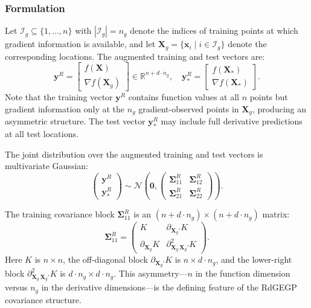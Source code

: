 \documentclass[12pt]{article}
\begin{document}
\subsubsection{Formulation}
\label{subsubsec:rdgegp_formulation}

Let $\mathcal{I}_g \subseteq \{1, \ldots, n\}$ with $|\mathcal{I}_g| = n_g$ denote the indices of training points at which gradient information is available, and let $\mathbf{X}_g = \{\mathbf{x}_i \mid i \in \mathcal{I}_g\}$ denote the corresponding locations. The augmented training and test vectors are:
\begin{equation}
	\label{eqn:rdgegp_aug_vectors}
	\mathbf{y}^{R} = \begin{bmatrix} f(\mathbf{X}) \\ \nabla f(\mathbf{X}_g) \end{bmatrix} \in \mathbb{R}^{n + d \cdot n_g}, \quad
	\mathbf{y}^{R}_* = \begin{bmatrix} f(\mathbf{X}_*) \\ \nabla f(\mathbf{X}_*) \end{bmatrix}.
\end{equation}
Note that the training vector $\mathbf{y}^R$ contains function values at all $n$ points but gradient information only at the $n_g$ gradient-observed points in $\mathbf{X}_g$, producing an asymmetric structure. The test vector $\mathbf{y}^R_*$ may include full derivative predictions at all test locations.

The joint distribution over the augmented training and test vectors is multivariate Gaussian:
\begin{equation}
	\label{eqn:rdgegp_joint_dist}
	\begin{pmatrix}
		\mathbf{y}^{R} \\
		\mathbf{y}^{R}_*
	\end{pmatrix}
	\sim \mathcal{N}\left(
	\mathbf{0},
	\begin{pmatrix}
		\boldsymbol{\Sigma}^{R}_{11} & \boldsymbol{\Sigma}^{R}_{12} \\
		\boldsymbol{\Sigma}^{R}_{21} & \boldsymbol{\Sigma}^{R}_{22}
	\end{pmatrix}
	\right).
\end{equation}

The training covariance block $\boldsymbol{\Sigma}^{R}_{11}$ is an $(n + d \cdot n_g) \times (n + d \cdot n_g)$ matrix:
\begin{equation}
	\label{eqn:rdgegp_S11}
	\boldsymbol{\Sigma}^{R}_{11} =
	\begin{pmatrix}
		K & \partial_{\mathbf{X}_g'} K \\
		\partial_{\mathbf{X}_g} K & \partial^2_{\mathbf{X}_g\,\mathbf{X}_g'} K
	\end{pmatrix}.
\end{equation}
Here $K$ is $n \times n$, the off-diagonal block $\partial_{\mathbf{X}_g'} K$ is $n \times d \cdot n_g$, and the lower-right block $\partial^2_{\mathbf{X}_g\,\mathbf{X}_g'} K$ is $d \cdot n_g \times d \cdot n_g$. This asymmetry---$n$ in the function dimension versus $n_g$ in the derivative dimensions---is the defining feature of the RdGEGP covariance structure.
\end{document}
